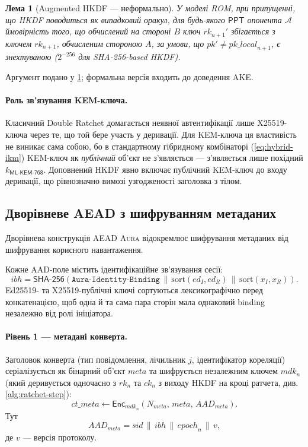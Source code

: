 \documentclass[11pt,a4paper]{article}
\newtheorem{lemma}[theorem]{Лема}
\theoremstyle{definition}
\newcommand{\ppt}{\ensuremath{\mathsf{PPT}}}
\newcommand{\advA}{\ensuremath{\mathcal{A}}}
\newcommand{\SHA}{\textsf{SHA-256}}
\renewcommand{\DH}{\textsf{X25519}}
\newcommand{\KEM}{\textsf{ML-KEM-768}}
\newcommand{\Enc}{\textsf{Enc}}
\newcommand{\concat}{\ensuremath{\,\|\,}}
\newcommand{\rk}{\ensuremath{\mathit{rk}}}
\newcommand{\ck}{\ensuremath{\mathit{ck}}}
\newcommand{\mdk}{\ensuremath{\mathit{mdk}}}
\newcommand{\epochv}{\ensuremath{\mathit{epoch}}}
\newcommand{\Aura}{\mbox{\normalfont\scshape Aura}}
\begin{document}
\begin{lemma}[Augmented HKDF — неформально]\label{lem:augmented-informal}
У моделі ROM, при припущенні, що HKDF поводиться як випадковий оракул,
для будь-якого \ppt{} опонента $\advA$ ймовірність того, що
обчислений на стороні $B$ ключ $\rk_{n+1}'$ збігається з ключем
$\rk_{n+1}$, обчисленим стороною $A$, за умови, що
$\mathit{pk}' \neq \mathit{pk\_local}_{n+1}$, є знехтуваною
($2^{-256}$ для SHA-256-based HKDF).
\end{lemma}

Аргумент подано у \cref{lem:augmented-informal}; формальна версія
входить до доведення AKE.

\paragraph{Роль зв'язування KEM-ключа.}
Класичний Double Ratchet домагається неявної автентифікації лише
\DH{}-ключа через те, що той бере участь у деривації. Для KEM-ключа
ця властивість не виникає сама собою, бо в стандартному гібридному
комбінаторі (\cref{eq:hybrid-ikm}) KEM-ключ як \emph{публічний} об'єкт
не з'являється — з'являється лише похідний $k_{\KEM}$. Доповнений
HKDF явно включає публічний KEM-ключ до входу деривації,
що рівнозначно вимозі узгодженості заголовка з тілом.

\subsection{Дворівневе AEAD з шифруванням метаданих}\label{sec:two-layer}

Дворівнева конструкція AEAD \Aura{} відокремлює шифрування метаданих
від шифрування корисного навантаження.

Кожне AAD-поле містить ідентифікаційне зв'язування сесії:
\begin{equation}\label{eq:identity-binding}
  \mathit{ibh} =
  \SHA(\texttt{Aura-Identity-Binding}
  \concat \mathrm{sort}(\mathit{ed}_I,\mathit{ed}_R)
  \concat \mathrm{sort}(\mathit{x}_I,\mathit{x}_R)).
\end{equation}
Ed25519- та X25519-публічні ключі сортуються лексикографічно перед
конкатенацією, щоб одна й та сама пара сторін мала однаковий binding
незалежно від ролі ініціатора.

\paragraph{Рівень 1 — метадані конверта.}
Заголовок конверта (тип повідомлення, лічильник $j$,
ідентифікатор кореляції) серіалізується як
бінарний об'єкт $\mathit{meta}$ та шифрується незалежним ключем
$\mdk_n$ (який деривується одночасно з $\rk_n$ та $\ck_n$
з виходу HKDF на кроці ратчета, див. \cref{alg:ratchet-step}):
\begin{equation}\label{eq:metadata-aead}
  \mathit{ct\_meta} \gets \Enc_{\mdk_n}(N_{\mathit{meta}},\,
  \mathit{meta},\, \mathit{AAD}_{\mathit{meta}}).
\end{equation}
Тут
\begin{equation}\label{eq:metadata-aad}
  \mathit{AAD}_{\mathit{meta}}
  = \mathit{sid} \concat \mathit{ibh} \concat \epochv_n \concat v,
\end{equation}
де $v$ — версія протоколу.
\end{document}
